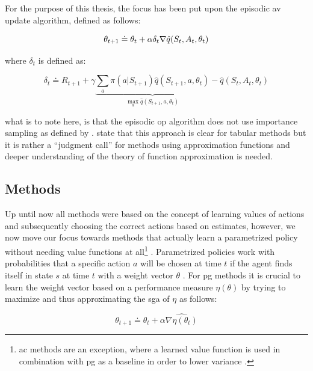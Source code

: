 For the purpose of this thesis, the focus has been put upon the episodic \gls{av} update algorithm, defined as follows:

\begin{equation}
	\theta_{t+1} \doteq \theta_t + \alpha \delta_t \nabla \hat{q} (S_t,A_t,\theta_t)\\
\end{equation}

where $\delta_t$ is defined as:

\begin{equation}
	\delta_t \doteq R_{t+1} + \gamma \underbrace{\sum_a \pi (a|S_{t+1}) \hat{q} (S_{t+1},a,\theta_t)}_{\max_a \hat{q} (S_{t+1},a,\theta_t)} - \hat{q} (S_t,A_t,\theta_t)
\end{equation}

what is to note here, is that the episodic \gls{op} algorithm does not use importance sampling as defined by  \citep[p. 244]{Sutton2017}. \citet[p. 244]{Sutton2017} state that this approach is clear for tabular methods but it is rather a ``judgment call'' for methods using approximation functions and deeper understanding of the theory of function approximation is needed.

\subsection{ Methods}
\label{subsec:polgrad_methods}

Up until now all methods were based on the concept of learning values of actions and subsequently choosing the correct actions based on estimates, however, we now move our focus towards methods that actually learn a parametrized policy without needing value functions at all\footnote{\gls{ac} methods are an exception, where a learned value function is used in combination with \gls{pg} as a baseline in order to lower variance \citep{Sutton2017}.}  \citep[p. 265]{Sutton2017}. Parametrized policies work with probabilities that a specific action $a$ will be chosen at time $t$ if the agent finds itself in state $s$ at time $t$ with a weight vector $\theta$ \citep[p. 265]{Sutton2017}. For \gls{pg} methods it is crucial to learn the weight vector based on a performance measure $\eta(\theta)$ by trying to maximize and thus approximating the \gls{sga} of $\eta$ as follows:

\begin{equation}
	\theta_{t+1} \doteq \theta_t + \alpha \widehat{\nabla \eta (\theta_t)}
\end{equation}

